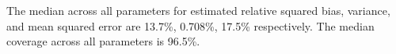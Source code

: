 The median across all parameters for  estimated relative squared bias, variance, and mean squared error are 13.7\%, 0.708\%, 17.5\% respectively. The median coverage across all parameters is 96.5\%.